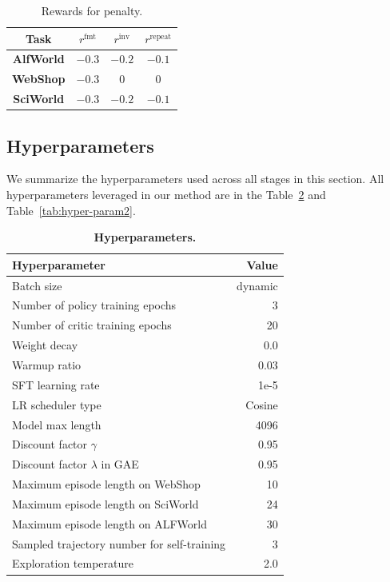\begin{table}[t]
\centering
\caption{Rewards for penalty.}
\setlength{\tabcolsep}{6pt}
\begin{tabular}{cccc}
\toprule
\textbf{Task} & $r^{\text{fmt}}$ & $r^{\text{inv}}$ & $r^{\text{repeat}}$ \\
\midrule
\textbf{AlfWorld} & $-0.3$ & $-0.2$  & $-0.1$  \\
\textbf{WebShop} & $-0.3$ & $0$  & $0$  \\
\textbf{SciWorld}           & $-0.3$ & $-0.2$ & $-0.1$ \\
\bottomrule
\end{tabular}
\label{tab:rews}
\end{table}

\subsection{Hyperparameters}
\label{app:hyper-param}
We summarize the hyperparameters used across all stages in this section. All hyperparameters leveraged in our method are in the Table~\ref{tab:hyper-param} and  Table~\ref{tab:hyper-param2}.  
\begin{table}[t]
\centering
\small
\caption{\textbf{Hyperparameters.}}
\label{tab:hyperparams}
\begin{tabular}{l r}
\toprule
\textbf{Hyperparameter} & \textbf{Value} \\
\midrule
Batch size & dynamic \\
Number of policy training epochs & 3 \\
Number of critic training epochs & 20 \\
Weight decay & 0.0 \\
Warmup ratio & 0.03 \\
SFT learning rate & 1e-5 \\
LR scheduler type & Cosine \\
Model max length & 4096 \\
Discount factor $\gamma$ & 0.95 \\
Discount factor $\lambda$ in GAE & 0.95 \\
Maximum episode length on WebShop & 10 \\
Maximum episode length on SciWorld & 24 \\
Maximum episode length on ALFWorld & 30 \\
Sampled trajectory number for self-training & 3 \\
Exploration temperature & 2.0 \\
\bottomrule
\end{tabular}
\label{tab:hyper-param}
\end{table}

